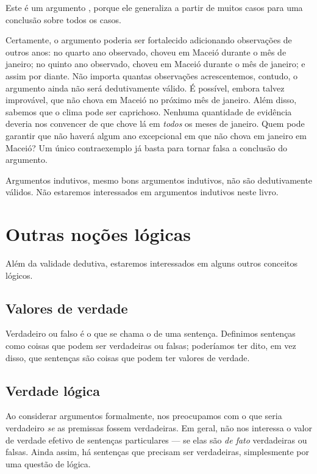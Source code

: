Este é um argumento , porque ele generaliza a partir de muitos casos para uma conclusão sobre todos os casos.

Certamente, o argumento poderia ser fortalecido adicionando observações de outros anos: no quarto ano observado, choveu em Maceió durante o mês de janeiro; no quinto ano observado, choveu em Maceió durante o mês de janeiro; e assim por diante. Não importa quantas observações acrescentemos, contudo, o argumento ainda não será dedutivamente válido. É possível, embora talvez improvável, que não chova em Maceió no próximo mês de janeiro. Além disso, sabemos que o clima pode ser caprichoso. Nenhuma quantidade de evidência deveria nos convencer de que chove lá em \emph{todos} os meses de janeiro. Quem pode garantir que não haverá algum ano excepcional em que não chova em janeiro em Maceió? Um único contraexemplo já basta para tornar falsa a conclusão do argumento.

Argumentos indutivos, mesmo bons argumentos indutivos, não são dedutivamente válidos. Não estaremos interessados em argumentos indutivos neste livro.

\section{Outras noções lógicas}

Além da validade dedutiva, estaremos interessados em alguns outros conceitos lógicos.

\subsection{Valores de verdade}
Verdadeiro ou falso é o que se chama o  de uma sentença. Definimos sentenças como coisas que podem ser verdadeiras ou falsas; poderíamos ter dito, em vez disso, que sentenças são coisas que podem ter valores de verdade.

\subsection{Verdade lógica}

Ao considerar argumentos formalmente, nos preocupamos com o que seria verdadeiro \emph{se} as premissas fossem verdadeiras. Em geral, não nos interessa o valor de verdade efetivo de sentenças particulares — se elas são \emph{de fato} verdadeiras ou falsas. Ainda assim, há sentenças que precisam ser verdadeiras, simplesmente por uma questão de lógica.

